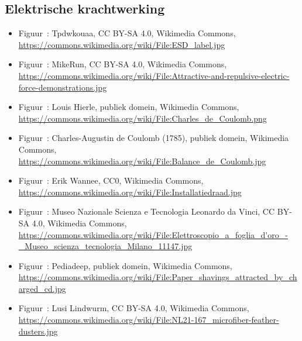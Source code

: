 \documentclass{ximera}
\begin{document}
\subsection*{Elektrische krachtwerking}
\begin{itemize}
        \item Figuur~: Tpdwkouaa, CC BY-SA 4.0, Wikimedia Commons, \url{https://commons.wikimedia.org/wiki/File:ESD_label.jpg}
        \item Figuur~: MikeRun, CC BY-SA 4.0, Wikimedia Commons, \url{https://commons.wikimedia.org/wiki/File:Attractive-and-repulsive-electric-force-demonstrations.jpg}
        \item Figuur~: Louis Hierle, publiek domein, Wikimedia Commons, \url{https://commons.wikimedia.org/wiki/File:Charles_de_Coulomb.png}
        \item Figuur~: Charles-Augustin de Coulomb (1785), publiek domein, Wikimedia Commons, \url{https://commons.wikimedia.org/wiki/File:Balance_de_Coulomb.jpg}
        \item Figuur~: Erik Wannee, CC0, Wikimedia Commons, \url{https://commons.wikimedia.org/wiki/File:Installatiedraad.jpg}
        \item Figuur~: Museo Nazionale Scienza e Tecnologia Leonardo da Vinci, CC BY-SA 4.0, Wikimedia Commons, \url{https://commons.wikimedia.org/wiki/File:Elettroscopio_a_foglia_d'oro_-_Museo_scienza_tecnologia_Milano_11147.jpg}
        \item Figuur~: Pediadeep, publiek domein, Wikimedia Commons, \url{https://commons.wikimedia.org/wiki/File:Paper_shavings_attracted_by_charged_cd.jpg}
        \item Figuur~: Lusi Lindwurm, CC BY-SA 4.0, Wikimedia Commons, \url{https://commons.wikimedia.org/wiki/File:NL21-167_microfiber-feather-dusters.jpg}

\end{itemize}
\end{document}

